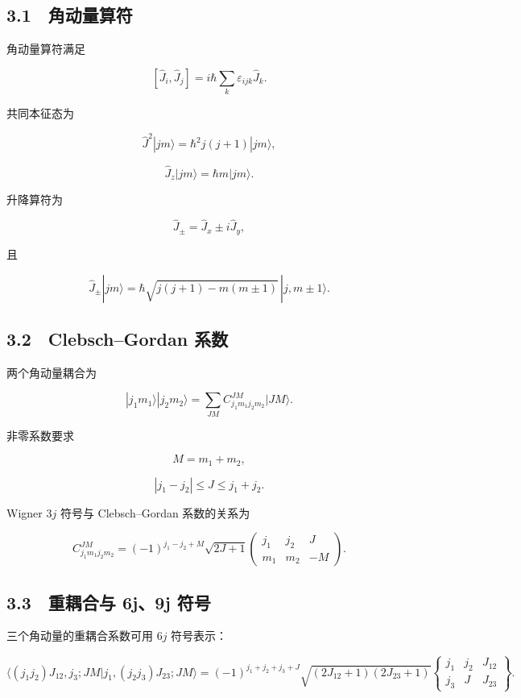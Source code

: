 \documentclass[
  a4paper,
]{ctexbook}
\begin{document}
\hypertarget{ux89d2ux52a8ux91cfux7b97ux7b26}{%
\subsection{3.1　角动量算符}\label{ux89d2ux52a8ux91cfux7b97ux7b26}}

角动量算符满足

\[
[\hat J_i,\hat J_j]
=
i\hbar\sum_k\varepsilon_{ijk}\hat J_k.
\]

共同本征态为

\[
\hat J^2|jm\rangle
=
\hbar^2j(j+1)|jm\rangle,
\]

\[
\hat J_z|jm\rangle
=
\hbar m|jm\rangle.
\]

升降算符为

\[
\hat J_\pm=\hat J_x\pm i\hat J_y,
\]

且

\[
\hat J_\pm|jm\rangle
=
\hbar\sqrt{j(j+1)-m(m\pm1)}\,|j,m\pm1\rangle.
\]

\hypertarget{clebschgordan-ux7cfbux6570}{%
\subsection{3.2　Clebsch--Gordan
系数}\label{clebschgordan-ux7cfbux6570}}

两个角动量耦合为

\[
|j_1m_1\rangle|j_2m_2\rangle
=
\sum_{JM}
C^{JM}_{j_1m_1j_2m_2}|JM\rangle.
\]

非零系数要求

\[
M=m_1+m_2,
\]

\[
|j_1-j_2|\le J\le j_1+j_2.
\]

Wigner \(3j\) 符号与 Clebsch--Gordan 系数的关系为

\[
C^{JM}_{j_1m_1j_2m_2}
=
(-1)^{j_1-j_2+M}\sqrt{2J+1}
\begin{pmatrix}
j_1 & j_2 & J\\
m_1 & m_2 & -M
\end{pmatrix}.
\]

\hypertarget{ux91cdux8026ux5408ux4e0e-6j9j-ux7b26ux53f7}{%
\subsection{3.3　重耦合与 6j、9j
符号}\label{ux91cdux8026ux5408ux4e0e-6j9j-ux7b26ux53f7}}

三个角动量的重耦合系数可用 \(6j\) 符号表示：

\[
\langle (j_1j_2)J_{12},j_3;JM|j_1,(j_2j_3)J_{23};JM\rangle
=
(-1)^{j_1+j_2+j_3+J}
\sqrt{(2J_{12}+1)(2J_{23}+1)}
\begin{Bmatrix}
j_1 & j_2 & J_{12}\\
j_3 & J & J_{23}
\end{Bmatrix}.
\]
\end{document}
